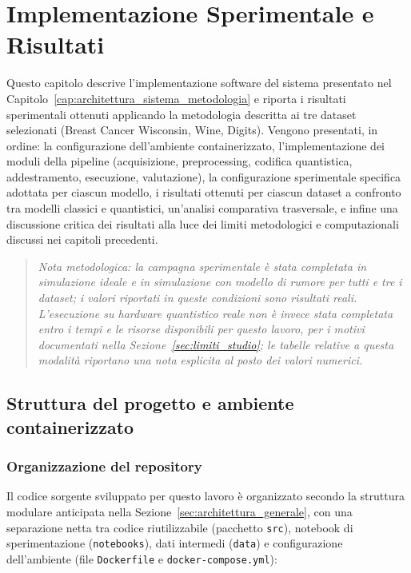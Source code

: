 \chapter{Implementazione Sperimentale e Risultati}
\label{cap:implementazione_sperimentale_risultati}

Questo capitolo descrive l'implementazione software del sistema presentato nel Capitolo~\ref{cap:architettura_sistema_metodologia} e riporta i risultati sperimentali ottenuti applicando la metodologia descritta ai tre dataset selezionati (Breast Cancer Wisconsin, Wine, Digits). Vengono presentati, in ordine: la configurazione dell'ambiente containerizzato, l'implementazione dei moduli della pipeline (acquisizione, preprocessing, codifica quantistica, addestramento, esecuzione, valutazione), la configurazione sperimentale specifica adottata per ciascun modello, i risultati ottenuti per ciascun dataset a confronto tra modelli classici e quantistici, un'analisi comparativa trasversale, e infine una discussione critica dei risultati alla luce dei limiti metodologici e computazionali discussi nei capitoli precedenti.

\begin{quote}
\textit{Nota metodologica: la campagna sperimentale è stata completata in simulazione ideale e in simulazione con modello di rumore per tutti e tre i dataset; i valori riportati in queste condizioni sono risultati reali. L'esecuzione su hardware quantistico reale non è invece stata completata entro i tempi e le risorse disponibili per questo lavoro, per i motivi documentati nella Sezione~\ref{sec:limiti_studio}; le tabelle relative a questa modalità riportano una nota esplicita al posto dei valori numerici.}
\end{quote}

\section{Struttura del progetto e ambiente containerizzato}
\label{sec:struttura_progetto}

\subsection{Organizzazione del repository}
Il codice sorgente sviluppato per questo lavoro è organizzato secondo la struttura modulare anticipata nella Sezione~\ref{sec:architettura_generale}, con una separazione netta tra codice riutilizzabile (pacchetto \texttt{src}), notebook di sperimentazione (\texttt{notebooks}), dati intermedi (\texttt{data}) e configurazione dell'ambiente (file \texttt{Dockerfile} e \texttt{docker-compose.yml}):

